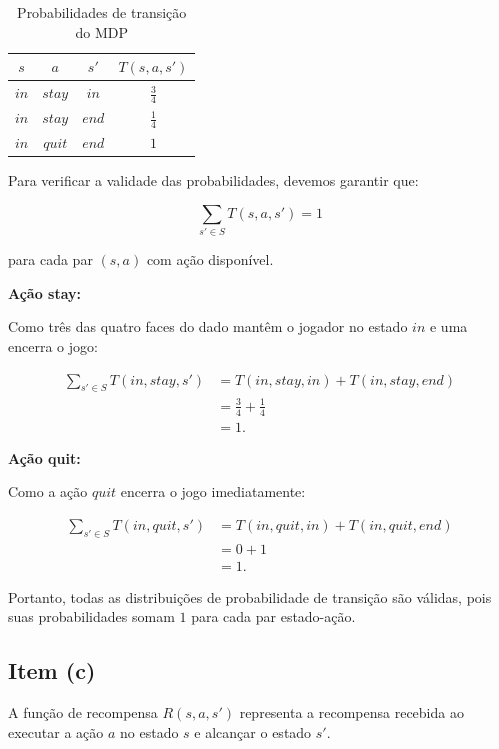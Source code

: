 \begin{table}[H]
    \centering
    \caption{Probabilidades de transição do MDP}
    \label{tab:transicoes_mdp}
    \begin{tabular}{cccc}
        \toprule
        $s$ & $a$ & $s'$ & $T(s,a,s')$ \\
        \midrule
        $in$ & $stay$ & $in$  & $\frac{3}{4}$ \\
        $in$ & $stay$ & $end$ & $\frac{1}{4}$ \\
        $in$ & $quit$ & $end$ & $1$ \\
        \bottomrule
    \end{tabular}
\end{table}

Para verificar a validade das probabilidades,
devemos garantir que:

\[
    \sum_{s' \in S} T(s,a,s') = 1
\]

para cada par $(s,a)$ com ação disponível.

\textbf{Ação stay:}

Como três das quatro faces do dado mantêm o
jogador no estado $in$ e uma encerra o jogo:

\[
\begin{aligned}
    \sum_{s' \in S} T(in,stay,s')
    &= T(in,stay,in) + T(in,stay,end)\\
    &= \frac{3}{4} + \frac{1}{4}\\
    &= 1.
\end{aligned}
\]

\textbf{Ação quit:}

Como a ação $quit$ encerra o jogo imediatamente:

\[
\begin{aligned}
    \sum_{s' \in S} T(in,quit,s')
    &= T(in,quit,in) + T(in,quit,end)\\
    &= 0 + 1\\
    &= 1.
\end{aligned}
\]

Portanto, todas as distribuições de probabilidade
de transição são válidas, pois suas probabilidades
somam $1$ para cada par estado-ação.


\subsection{Item (c)}

A função de recompensa $R(s,a,s')$ representa
a recompensa recebida ao executar a ação $a$
no estado $s$ e alcançar o estado $s'$.

